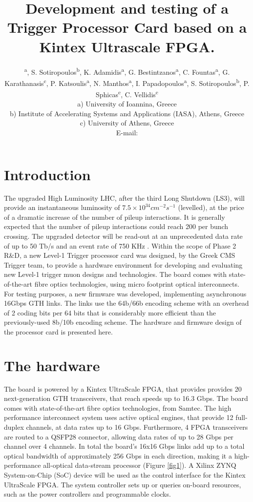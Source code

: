 \documentclass[a4paper]{PoS}
\title{Development and testing of a Trigger Processor Card based on a Kintex Ultrascale FPGA.}
\author{\speaker{S. Mallios}\textsuperscript{ a}, S. Sotiropoulos\textsuperscript{b}, K. Adamidis\textsuperscript{a}, G. Bestintzanos\textsuperscript{a}, C. Fountas\textsuperscript{a}, G. Karathanasis\textsuperscript{c}, P. Katsoulis\textsuperscript{a}, N. Manthos\textsuperscript{a}, I. Papadopoulos\textsuperscript{a}, S. Sotiropoulos\textsuperscript{b}, P. Sphicas\textsuperscript{c}, C. Vellidis\textsuperscript{c}\\
\llap a) University of Ioannina, Greece\\
\llap b) Institute of Accelerating Systems and Applications (IASA), Athens, Greece\\
\llap c) University of Athens, Greece\\
E-mail: \email{stavros.mallios@cern.ch@mail.org}}
\begin{document}


\section{Introduction}
The upgraded High Luminosity LHC, after the third Long Shutdown (LS3), will provide an instantaneous luminosity of $7.5 \times 10^{34} cm^{-2} s^{-1}$ (levelled), at the price of a dramatic increase of the number of pileup interactions. It is generally expected that the number of pileup interactions could reach 200 per bunch crossing. The upgraded detector will be read-out at an unprecedented data rate of up to 50 Tb/s and an event rate of 750 KHz \cite{Collaboration:2283192}. Within the scope of Phase 2 R\&D, a new Level-1 Trigger processor card was designed, by the Greek CMS Trigger team, to provide a hardware environment for developing and evaluating new Level-1 trigger muon designs and technologies. The board comes with state-of-the-art fibre optics technologies, using micro footprint optical interconnects. For testing purposes, a new firmware was developed, implementing asynchronous 16Gbps GTH links. The links use the 64b/66b encoding scheme with an overhead of 2 coding bits per 64 bits that is considerably more efficient than the previously-used 8b/10b encoding scheme. The hardware and firmware design of the processor card is presented here.

\section{The hardware}
The board is powered by a Kintex UltraScale FPGA, that provides provides 20 next-generation GTH transceivers, that reach speeds up to 16.3 Gbps. The board comes with state-of-the-art fibre optics technologies, from Samtec. The high performance interconnect system uses active optical engines, that provide 12 full-duplex channels, at data rates up to 16 Gbps. Furthermore, 4 FPGA transceivers are routed to a QSFP28 connector, allowing data rates of up to 28 Gbps per channel over 4 channels. In total the board’s 16x16 Gbps links add up to a total optical bandwidth of approximately 256 Gbps in each direction, making it a high-performance all-optical data-stream processor (Figure \ref{fig1}). A Xilinx ZYNQ System-on-Chip (SoC) device will be used as the control interface for the Kintex UltraScale FPGA. The system controller sets up or queries on-board resources, such as the power controllers and programmable clocks.\\
\end{document}
